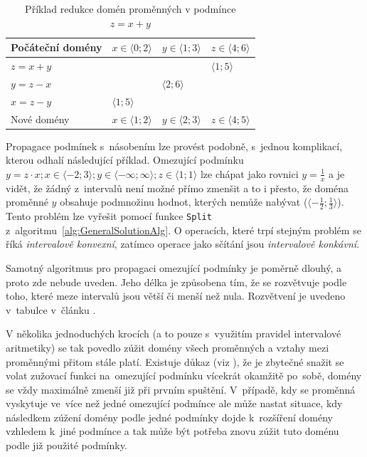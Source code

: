 \begin{table}
\centering
\begin{tabular}{|l|l|l|l|}
\hline
 Počáteční domény & $x \in \langle 0;2 \rangle$ & $y \in \langle 1;3 \rangle$ & $z \in \langle 4;6 \rangle$  \\ \hline
 $z = x+y$  &  & &  $\langle 1;5 \rangle$  \\ \hline
 $y = z-x$  & & $\langle 2;6 \rangle$  &  \\ \hline
 $x = z-y$  & $\langle 1;5 \rangle$  &  &  \\ \hline
 Nové domény & $x \in \langle 1;2 \rangle$ & $y \in \langle 2;3 \rangle$ & $z \in \langle 4;5 \rangle$ \\ \hline
\end{tabular}
\caption{Příklad redukce domén proměnných v podmínce $z = x + y$}
\label{narrowingTable}
\end{table}


Propagace podmínek s~násobením lze provést podobně, s~jednou komplikací, kterou odhalí následující příklad. Omezující podmínku $y = z \cdot x; x \in \langle -2;3 \rangle; y \in \langle -\infty ; \infty \rangle; z \in \langle 1;1 \rangle $ lze chápat jako rovnici $ y = \frac{1}{x}$ a je vidět, že žádný z~intervalů není možné přímo zmenšit a to i přesto, že doména proměnné $y$ obsahuje podmnožinu hodnot, kterých nemůže nabývat ($ \langle -\frac{1}{2};\frac{1}{3} \rangle $). Tento problém lze vyřešit pomocí funkce \verb|Split| z~algoritmu~\ref{alg:GeneralSolutionAlg}. O operacích, které trpí stejným problém se říká \emph{intervalově konvexní}, zatímco operace jako sčítání jsou \emph{intervalově konkávní}.

Samotný algoritmus pro propagaci omezující podmínky je poměrně dlouhý, a proto zde nebude uveden. Jeho délka je způsobena tím, že se rozvětvuje podle toho, které meze intervalů jsou větší či menší než nula. Rozvětvení je uvedeno v~tabulce v~článku \cite{hickeyImplementation}.

V několika jednoduchých krocích (a to pouze s~využitím pravidel intervalové aritmetiky) se tak povedlo zúžit domény všech proměnných a vztahy mezi proměnnými přitom stále platí. Existuje důkaz (viz \cite{cleary87}), že je zbytečné snažit se volat zužovací funkci na~omezující podmínku vícekrát okamžitě po~sobě, domény se vždy maximálně zmenší již při prvním spuštění. V~případě, kdy se proměnná vyskytuje ve~více než jedné omezující podmínce ale může nastat situace, kdy následkem zúžení domény podle jedné podmínky dojde k~rozšíření domény vzhledem k~jiné podmínce a tak může být potřeba znovu zúžit tuto doménu podle již použité podmínky.





